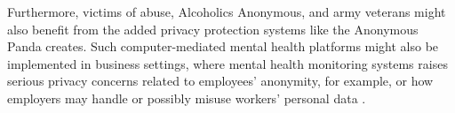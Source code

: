 Furthermore, victims of abuse, Alcoholics Anonymous, and army veterans might also benefit from the added privacy protection systems like the Anonymous Panda creates. Such computer-mediated mental health platforms might also be implemented in business settings, where mental health monitoring systems raises serious privacy concerns related to employees' anonymity, for example, or how employers may handle or possibly misuse workers' personal data \cite{XUE19}.
